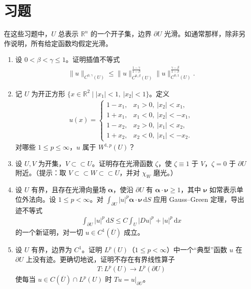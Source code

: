 \documentclass[../../main.tex]{subfiles}
\begin{document}
\section{习题}\label{section:ch05-习题}

在这些习题中，$U$ 总表示 $\mathbb{R}^{n}$ 的一个开子集，边界 $\partial U$ 光滑。如通常那样，除非另作说明，所有给定函数均假定光滑。

\begin{enumerate}
\item 设 $0<\beta<\gamma\leqslant 1$。证明插值不等式
\begin{align*}
\|u\|_{C^{0,\gamma}(U)}\leqslant\|u\|_{C^{0,\beta}(U)}^{\frac{1-\gamma}{1-\beta}}\|u\|_{C^{0,1}(U)}^{\frac{\gamma-\beta}{1-\beta}}.
\end{align*}

\item 记 $U$ 为开正方形 $\{x\in\mathbb{R}^{2}\mid |x_{1}|<1,\ |x_{2}|<1\}$。定义
\begin{align*}
u(x)=
\begin{cases}
1-x_{1}, & x_{1}>0,\ |x_{2}|<x_{1},\\
1+x_{1}, & x_{1}<0,\ |x_{2}|<-x_{1},\\
1-x_{2}, & x_{2}>0,\ |x_{1}|<x_{2},\\
1+x_{2}, & x_{2}<0,\ |x_{1}|<-x_{2}.
\end{cases}
\end{align*}
对哪些 $1\leqslant p\leqslant\infty$，$u$ 属于 $W^{1,p}(U)$？

\item 设 $U,V$ 为开集，$V\subset \subset U$。证明存在光滑函数 $\zeta$，使 $\zeta\equiv 1$ 于 $V$，$\zeta=0$ 于 $\partial U$ 附近。（提示：取 $V\subset \subset W\subset \subset U$，并对 $\chi_{W}$ 磨光。）

\item 设 $U$ 有界，且存在光滑向量场 $\boldsymbol{\alpha}$，使沿 $\partial U$ 有 $\boldsymbol{\alpha}\cdot\boldsymbol{\nu}\geqslant 1$，其中 $\boldsymbol{\nu}$ 如常表示单位外法向。设 $1\leqslant p<\infty$。对 $\int_{\partial U}|u|^{p}\boldsymbol{\alpha}\cdot\boldsymbol{\nu}\,\mathrm{d}S$ 应用 Gauss--Green 定理，导出迹不等式
\begin{align*}
\int_{\partial U}|u|^{p}\,\mathrm{d}S\leqslant C\int_{U}|Du|^{p}+|u|^{p}\,\mathrm{d}x
\end{align*}
的一个新证明，对一切 $u\in C^{1}(\overline{U})$ 成立。

\item 设 $U$ 有界，边界为 $C^{1}$。证明 $L^{p}(U)$（$1\leqslant p<\infty$）中一个“典型”函数 $u$ 在 $\partial U$ 上没有迹。更确切地说，证明不存在有界线性算子
\begin{align*}
T:L^{p}(U)\to L^{p}(\partial U)
\end{align*}
使每当 $u\in C(\overline{U})\cap L^{p}(U)$ 时 $Tu=u|_{\partial U}$。


\end{enumerate}
\end{document}

